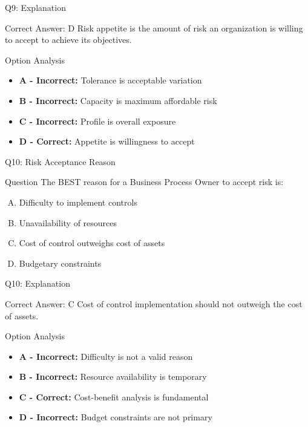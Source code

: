 \documentclass{beamer}
\begin{document}
	\begin{frame}{Q9: Explanation}
		\begin{block}{Correct Answer: D}
			Risk appetite is the amount of risk an organization is willing to accept to achieve its objectives.
		\end{block}
		\begin{block}{Option Analysis}
			\begin{itemize}
				\item \textbf{A - Incorrect:} Tolerance is acceptable variation
				\item \textbf{B - Incorrect:} Capacity is maximum affordable risk
				\item \textbf{C - Incorrect:} Profile is overall exposure
				\item \textbf{D - Correct:} Appetite is willingness to accept
			\end{itemize}
		\end{block}
	\end{frame}
	
	\begin{frame}{Q10: Risk Acceptance Reason}
		\begin{block}{Question}
			The BEST reason for a Business Process Owner to accept risk is:
		\end{block}
		\begin{enumerate}[(A)]
			\item Difficulty to implement controls
			\item Unavailability of resources
			\item Cost of control outweighs cost of assets
			\item Budgetary constraints
		\end{enumerate}
	\end{frame}
	
	\begin{frame}{Q10: Explanation}
		\begin{block}{Correct Answer: C}
			Cost of control implementation should not outweigh the cost of assets.
		\end{block}
		\begin{block}{Option Analysis}
			\begin{itemize}
				\item \textbf{A - Incorrect:} Difficulty is not a valid reason
				\item \textbf{B - Incorrect:} Resource availability is temporary
				\item \textbf{C - Correct:} Cost-benefit analysis is fundamental
				\item \textbf{D - Incorrect:} Budget constraints are not primary
			\end{itemize}
		\end{block}
	\end{frame}
	
\end{document}
